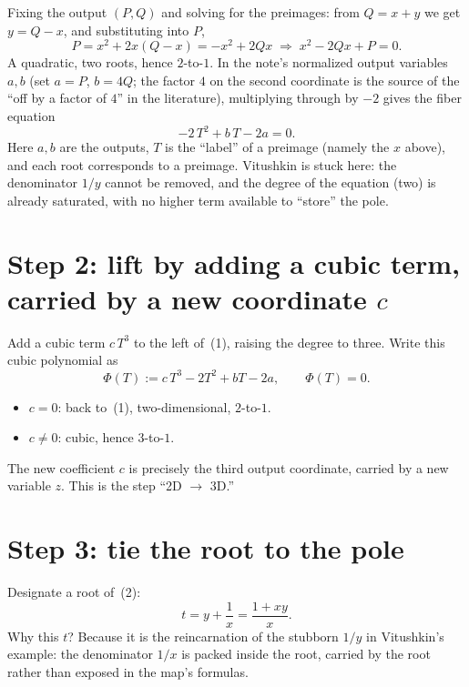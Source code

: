 \documentclass[11pt]{article}
\theoremstyle{plain}
\theoremstyle{definition}
\begin{document}
Fixing the output $(P,Q)$ and solving for the preimages: from $Q=x+y$ we get
$y=Q-x$, and substituting into $P$,
\[
  P = x^2+2x(Q-x) = -x^2+2Qx
  \;\Longrightarrow\;
  x^2-2Qx+P = 0 .
\]
A quadratic, two roots, hence $2$-to-$1$. In the note's normalized output
variables $a,b$ (set $a=P$, $b=4Q$; the factor $4$ on the second coordinate
is the source of the ``off by a factor of $4$'' in the literature),
multiplying through by $-2$ gives the fiber equation
\begin{equation}
  -2\,T^2 + b\,T - 2a = 0 . \label{eq:fiber2d}
\end{equation}
Here $a,b$ are the outputs, $T$ is the ``label'' of a preimage (namely the
$x$ above), and each root corresponds to a preimage. Vitushkin is stuck
here: the denominator $1/y$ cannot be removed, and the degree of the
equation (two) is already saturated, with no higher term available to
``store'' the pole.

\section*{Step 2: lift by adding a cubic term, carried by a new coordinate $c$}
Add a cubic term $c\,T^3$ to the left of~(1), raising the degree to three.
Write this cubic polynomial as
\begin{equation}
  \Phi(T):=c\,T^3 - 2T^2 + bT - 2a,\qquad \Phi(T)=0 . \label{eq:fiber3d}
\end{equation}
\begin{itemize}[nosep]
  \item $c=0$: back to~(1), two-dimensional, $2$-to-$1$.
  \item $c\neq 0$: cubic, hence $3$-to-$1$.
\end{itemize}
The new coefficient $c$ is precisely the third output coordinate, carried by
a new variable $z$. This is the step ``2D $\to$ 3D.''

\section*{Step 3: tie the root to the pole}
Designate a root of~(2):
\[
  t = y + \frac{1}{x} = \frac{1+xy}{x}.
\]
Why this $t$? Because it is the reincarnation of the stubborn $1/y$ in
Vitushkin's example: the denominator $1/x$ is packed inside the root, carried
by the root rather than exposed in the map's formulas.
\end{document}
